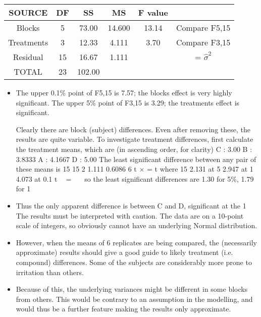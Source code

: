 \documentclass[a4paper,12pt]{article}
\begin{document}
\begin{enumerate}
\begin{center}
\begin{tabular}{|c|c|c|c|c|c|} \hline
SOURCE &  DF & SS&  MS&  F value &   \\ \hline
Blocks &  5 & 73.00 & 14.600 & 13.14 & Compare F5,15 \\ \hline
Treatments & 3 & 12.33&  4.111 & 3.70 &   Compare F3,15 \\ \hline
Residual & 15 & 16.67 & 1.111 & & = $\hat{\sigma}^2$ \\ \hline
TOTAL & 23 & 102.00 & & & \\ \hline
\end{tabular}
\end{center}

\begin{itemize}
    \item 
The upper 0.1\% point of F5,15 is 7.57; the blocks effect is very highly significant.
The upper 5\% point of F3,15 is 3.29; the treatments effect is significant.

Clearly there are block (subject) differences. Even after removing these, the results are quite variable.
To investigate treatment differences, first calculate the treatment means, which are (in
ascending order, for clarity)
C : 3.00 B : 3.8333 A : 4.1667 D : 5.00
The least significant difference between any pair of these means is
15 15
2 1.111 0.6086
6
t × = t where 15
2.131 at 5%
2.947 at 1%
4.073 at 0.1%
t

=


so the least significant differences are 1.30 for 5\%, 1.79 for 1%
\item Thus the only apparent difference is between C and D, significant at the 1%
The results must be interpreted with caution.
The data are on a 10-point scale of integers, so obviously cannot have an underlying
Normal distribution. 
\item However, when the means of 6 replicates are being compared,
the (necessarily approximate) results should give a good guide to likely treatment (i.e.
compound) differences.
Some of the subjects are considerably more prone to irritation than others. 
\item Because of
this, the underlying variances might be different in some blocks from others. This
would be contrary to an assumption in the modelling, and would thus be a further
feature making the results only approximate.

\end{itemize}
\end{enumerate}
\end{document}
